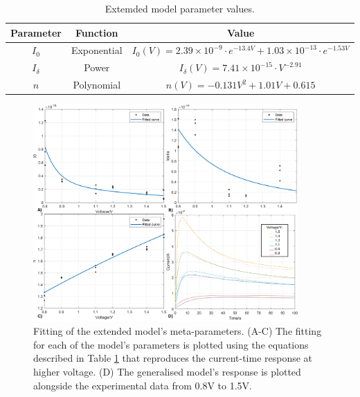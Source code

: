 \begin{table}[ht]
    \caption{Extemded model parameter values.}
    \centering
    \begin{tabular}{|c|c|c|}
    \hline
    Parameter   & Function                & Value                                      \\ \hline
    $I_0$       & Exponential             & $I_0(V) = 2.39\times10^{-9}\cdot e^{-13.4V} + 1.03\times 10^{-13}\cdot e^{-1.53V}$         \\ \hline
    $I_{\delta}$    & Power                  & $I_{\delta}(V)=7.41\times 10^{-15} \cdot V^{-2.91}$                 \\ \hline
    $n$ & Polynomial                & $n(V)=-0.131V^2 + 1.01V + 0.615$                         \\ \hline
    \end{tabular}
    \label{table:5c}
\end{table}


\begin{figure}[htbp!] 
    \centering    
    \includegraphics[width=0.9\textwidth]{Chapter5/Figs/i.png}
    \caption[Fitting of the extended model's meta-parameters.]{Fitting of the extended model's meta-parameters. (A-C) The fitting for each of the model's parameters is plotted using the equations described in Table \ref{table:5c} that reproduces the current-time response at higher voltage. (D) The generalised model's response is plotted alongside the experimental data from 0.8V to 1.5V.}
    \label{fig:5i}
\end{figure}

